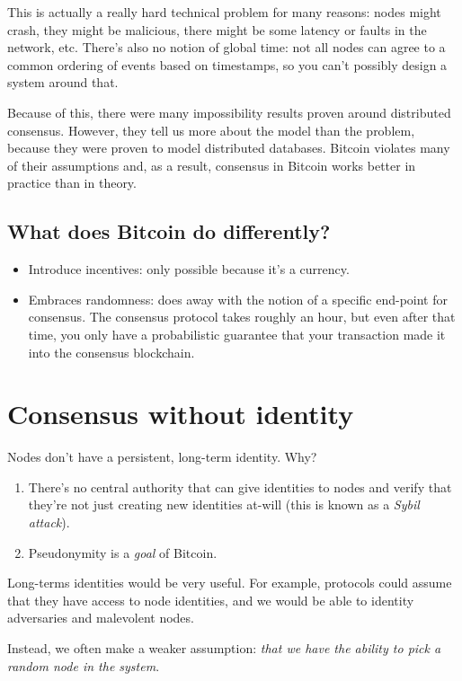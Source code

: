 \documentclass[12pt]{article}
\begin{document}
This is actually a really hard technical problem for many reasons: nodes might crash, they might be malicious, there might be some latency or faults in the network, etc. There's also no notion of global time: not all nodes can agree to a common ordering of events based on timestamps, so you can't possibly design a system around that.

Because of this, there were many impossibility results proven around distributed consensus. However, they tell us more about the model than the problem, because they were proven to model distributed databases. Bitcoin violates many of their assumptions and, as a result, consensus in Bitcoin works better in practice than in theory.

\subsection*{What does Bitcoin do differently?}
\begin{itemize}
\item Introduce incentives: only possible because it's a currency.
\item Embraces randomness: does away with the notion of a specific end-point for consensus. The consensus protocol takes roughly an hour, but even after that time, you only have a probabilistic guarantee that your transaction made it into the consensus blockchain.
\end{itemize}

\section*{Consensus without identity}

Nodes don't have a persistent, long-term identity. Why?

\begin{enumerate}
\item There's no central authority that can give identities to nodes and verify that they're not just creating new identities at-will (this is known as a \textit{Sybil attack}).
\item Pseudonymity is a \textit{goal} of Bitcoin.
\end{enumerate}

Long-terms identities would be very useful. For example, protocols could assume that they have access to node identities, and we would be able to identity adversaries and malevolent nodes.

Instead, we often make a weaker assumption: \textit{that we have the ability to pick a random node in the system}.
\end{document}

